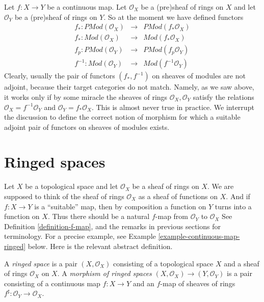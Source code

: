 \noindent
Let $f : X \to Y$ be a continuous map.
Let $\mathcal{O}_X$ be a (pre)sheaf of rings on $X$ and
let $\mathcal{O}_Y$ be a (pre)sheaf of rings on $Y$.
So at the moment we have defined functors
\begin{eqnarray*}
f_* : \textit{PMod}(\mathcal{O}_X) &
\longrightarrow &
\textit{PMod}(f_*\mathcal{O}_X) \\
f_* : \textit{Mod}(\mathcal{O}_X) &
\longrightarrow &
\textit{Mod}(f_*\mathcal{O}_X) \\
f_p : \textit{PMod}(\mathcal{O}_Y) &
\longrightarrow &
\textit{PMod}(f_p\mathcal{O}_Y) \\
f^{-1} : \textit{Mod}(\mathcal{O}_Y) &
\longrightarrow &
\textit{Mod}(f^{-1}\mathcal{O}_Y)
\end{eqnarray*}
Clearly, usually the pair of functors $(f_*, f^{-1})$
on sheaves of modules are not adjoint, because their target categories
do not match. Namely, as we saw above, it works only if by some miracle the
sheaves of rings $\mathcal{O}_X, \mathcal{O}_Y$ satisfy the
relations $\mathcal{O}_X = f^{-1}\mathcal{O}_Y$ and
$\mathcal{O}_Y = f_*\mathcal{O}_X$. This is almost never
true in practice. We interrupt the discussion to define
the correct notion of morphism for which a suitable adjoint
pair of functors on sheaves of modules exists.

\section{Ringed spaces}
\label{section-ringed-spaces}

\noindent
Let $X$ be a topological space and let $\mathcal{O}_X$
be a sheaf of rings on $X$. We are supposed to
think of the sheaf of rings $\mathcal{O}_X$ as a sheaf of functions
on $X$. And if $f : X \to Y$ is a ``suitable'' map, then by composition
a function on $Y$ turns into a function on $X$.
Thus there should be a natural
$f$-map from $\mathcal{O}_Y$ to $\mathcal{O}_X$
See Definition \ref{definition-f-map}, and the remarks in
previous sections for terminology. For a precise example, see
Example \ref{example-continuous-map-ringed} below. Here is the
relevant abstract definition.

\begin{definition}
\label{definition-ringed-space}
A {\it ringed space} is a pair $(X, \mathcal{O}_X)$ consisting
of a topological space $X$ and a sheaf of rings $\mathcal{O}_X$
on $X$. A {\it morphism of ringed spaces}
$(X, \mathcal{O}_X) \to (Y, \mathcal{O}_Y)$ is a pair
consisting of a continuous map $f : X \to Y$ and an
$f$-map of sheaves of rings
$f^\sharp : \mathcal{O}_Y \to \mathcal{O}_X$.
\end{definition}

